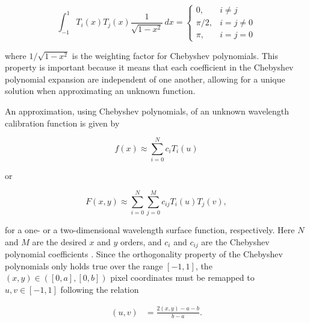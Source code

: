 \begin{equation}
    \int_{-1}^{1} T_{i}(x) T_{j}(x) \frac{1}{\sqrt{1-x^{2}}} \,dx =
    \begin{cases}
        0,       & i \neq j     \\
        \pi / 2, & i = j \neq 0 \\
        \pi,     & i = j = 0
    \end{cases}
    \label{eq:chebyorth}
\end{equation}

\noindent where $1 / \sqrt{1 - x^{2}}$ is the weighting factor for Chebyshev polynomials. This property is important because it means that each coefficient in the Chebyshev polynomial expansion are independent of one another, allowing for a unique solution when approximating an unknown function.
\prgph

An approximation, using Chebyshev polynomials, of an unknown wavelength calibration function is given by

\begin{equation}
    f(x) \approx \sum_{i = 0}^{N}  c_{i} T_{i}(u)
    \label{eq:chebyshev}
\end{equation}

\noindent or

\begin{equation}
    F(x, y) \approx \sum_{i = 0}^{N} \sum_{j = 0}^{M} c_{ij} T_{i}(u) T_{j}(v),
    \label{eq:chebyshev2D}
\end{equation}

\noindent for a one- or a two-dimensional wavelength surface function, respectively. Here $N$ and $M$ are the desired $x$ and $y$ orders, and $c_{i}$ and $c_{ij}$ are the Chebyshev polynomial coefficients \citep{chebysurf, cheby2d}. Since the orthogonality property of the Chebyshev polynomials only holds true over the range $[-1, 1]$, the $(x, y) \in ([0, a], [0, b])$ pixel coordinates must be remapped to $u, v \in [-1, 1]$ following the relation

\begin{align}
    (u, v) & = \frac{2 (x, y) - a - b}{b - a}.
    \label{eq:XtoUV}
\end{align}



